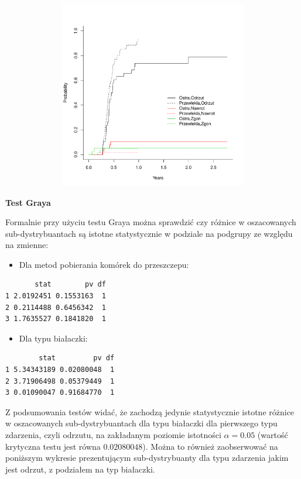 \documentclass[]{article}
\begin{document}
\vspace{-22pt}

\includegraphics[width=16cm,height=8.2cm]{plot2.pdf} \newpage

\textbf{Test Graya}

Formalnie przy użyciu testu Graya można sprawdzić czy różnice w
oszacowanych sub-dystrybuantach są istotne statystycznie w podziale na
podgrupy ze względu na zmienne:

\begin{itemize}
\itemsep1pt\parskip0pt
\item
  Dla metod pobierania komórek do przeszczepu:
\end{itemize}

\begin{verbatim}
       stat        pv df
1 2.0192451 0.1553163  1
2 0.2114488 0.6456342  1
3 1.7635527 0.1841820  1
\end{verbatim}

\begin{itemize}
\itemsep1pt\parskip0pt
\item
  Dla typu białaczki:
\end{itemize}

\begin{verbatim}
        stat         pv df
1 5.34343189 0.02080048  1
2 3.71906498 0.05379449  1
3 0.01090047 0.91684770  1
\end{verbatim}

Z podsumowania testów widać, że zachodzą jedynie statystycznie istotne
różnice w oszacowanych sub-dystrybuantach dla typu białaczki dla
pierwszego typu zdarzenia, czyli odrzutu, na zakładanym poziomie
istotności $\alpha=0.05$ (wartość krytyczna testu jest równa
$0.02080048$). Można to również zaobserwować na poniższym wykresie
prezentującym sub-dystrybuanty dla typu zdarzenia jakim jest odrzut, z
podziałem na typ białaczki.
\end{document}
